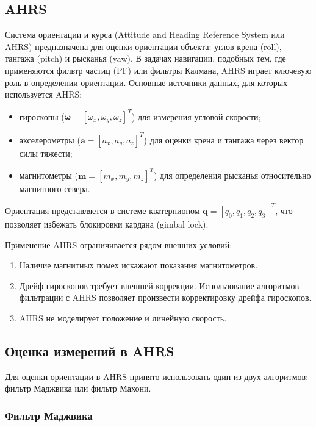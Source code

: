 {\subsection{AHRS}
\label{subsec:ahrs}

Система ориентации и курса (Attitude and Heading Reference System или AHRS) предназначена для оценки
ориентации объекта: углов крена (roll), тангажа (pitch) и рысканья (yaw).
В задачах навигации, подобных тем, где применяются фильтр частиц (PF) или фильтры Калмана,
AHRS играет ключевую роль в определении ориентации.
Основные источники данных, для которых используется AHRS: 
\begin{itemize}
    \item гироскопы (\(\boldsymbol{\omega} = [\omega_x, \omega_y, \omega_z]^T\)) для измерения угловой скорости;
    \item акселерометры (\(\mathbf{a} = [a_x, a_y, a_z]^T\)) для оценки крена и тангажа через вектор силы тяжести;
    \item магнитометры (\(\mathbf{m} = [m_x, m_y, m_z]^T\)) для определения рысканья относительно магнитного севера.
\end{itemize}

Ориентация представляется в системе кватернионом \(\mathbf{q} = [q_0, q_1, q_2, q_3]^T\), что позволяет
избежать блокировки кардана (gimbal lock).

Применение AHRS ограничивается рядом внешних условий:

\begin{enumerate}[label=\arabic*]
    \item Наличие магнитных помех искажают показания магнитометров.
    \item Дрейф гироскопов требует внешней коррекции. Использование алгоритмов фильтрации
	    с AHRS позволяет произвести корректировку дрейфа гироскопов.
    \item AHRS не моделирует положение и линейную скорость.
\end{enumerate}

\subsection{Оценка измерений в AHRS}

Для оценки ориентации в AHRS принято использовать один из двух алгоритмов: фильтр Маджвика или фильтр Махони.

\subsubsection{Фильтр Маджвика}

}
